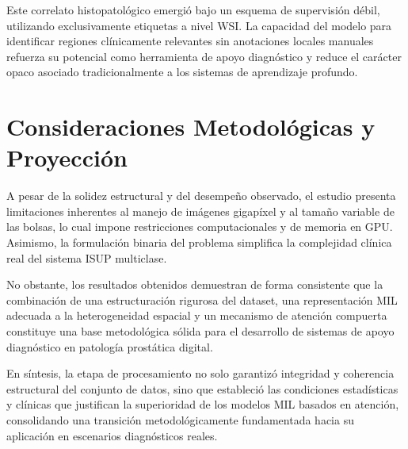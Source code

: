 Este correlato histopatológico emergió bajo un esquema de supervisión débil, utilizando exclusivamente etiquetas a nivel WSI. La capacidad del modelo para identificar regiones clínicamente relevantes sin anotaciones locales manuales refuerza su potencial como herramienta de apoyo diagnóstico y reduce el carácter opaco asociado tradicionalmente a los sistemas de aprendizaje profundo.

\section{Consideraciones Metodológicas y Proyección}
A pesar de la solidez estructural y del desempeño observado, el estudio presenta limitaciones inherentes al manejo de imágenes gigapíxel y al tamaño variable de las bolsas, lo cual impone restricciones computacionales y de memoria en GPU. Asimismo, la formulación binaria del problema simplifica la complejidad clínica real del sistema ISUP multiclase.\newline

No obstante, los resultados obtenidos demuestran de forma consistente que la combinación de una estructuración rigurosa del dataset, una representación MIL adecuada a la heterogeneidad espacial y un mecanismo de atención compuerta constituye una base metodológica sólida para el desarrollo de sistemas de apoyo diagnóstico en patología prostática digital.\newline

En síntesis, la etapa de procesamiento no solo garantizó integridad y coherencia estructural del conjunto de datos, sino que estableció las condiciones estadísticas y clínicas que justifican la superioridad de los modelos MIL basados en atención, consolidando una transición metodológicamente fundamentada hacia su aplicación en escenarios diagnósticos reales.